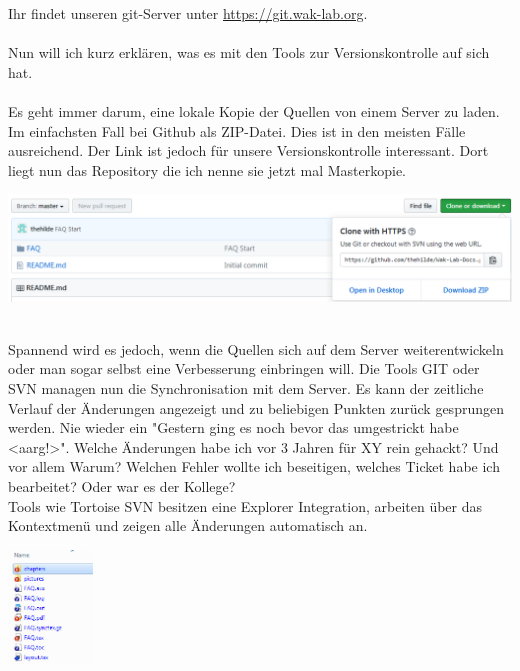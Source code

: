 Ihr findet unseren git-Server unter \url{https://git.wak-lab.org}.\\
\ \\
Nun will ich kurz erklären, was es mit den Tools zur Versionskontrolle auf sich hat.\\
\ \\
Es geht immer darum, eine lokale Kopie der Quellen von einem Server zu laden. Im einfachsten Fall bei Github als ZIP-Datei. Dies ist in den meisten Fälle ausreichend. Der Link ist jedoch für unsere Versionskontrolle interessant. Dort liegt nun das Repository die ich nenne sie jetzt mal Masterkopie. \\
\begin{minipage}[t]{\textwidth}
  \centering
  \includegraphics[width=\textwidth]{pictures/Clone.png}
  \label{img:Clone}
\end{minipage}
\ \\
Spannend wird es jedoch, wenn die Quellen sich auf dem Server weiterentwickeln oder man sogar selbst eine Verbesserung einbringen will. Die Tools GIT oder SVN managen nun die Synchronisation mit dem Server. Es kann der zeitliche Verlauf der Änderungen angezeigt und zu beliebigen Punkten zurück gesprungen werden. Nie wieder ein "Gestern ging es noch bevor das umgestrickt habe <aarg!>". Welche Änderungen habe ich vor 3 Jahren für XY rein gehackt? Und vor allem Warum? Welchen Fehler wollte ich beseitigen, welches Ticket habe ich bearbeitet? Oder war es der Kollege?  \\
Tools wie Tortoise SVN besitzen eine Explorer Integration, arbeiten über das Kontextmenü und zeigen alle Änderungen automatisch an. \\
\begin{minipage}[t]{\textwidth}
  \centering
  \includegraphics[height=3cm]{pictures/TortoiseSVNChanges.png}
  \label{img:TortoiseSVNChanges}
\end{minipage}
